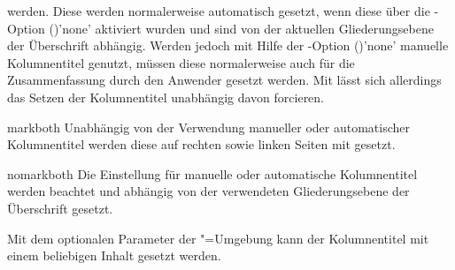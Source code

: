 \begin{Declaration*}{}
\begin{Declaration*}{}
\begin{Declaration*}{}
\begin{Declaration}[%
  v2.02!\Option{abstract=multiple}:ersetzt \Option{abstract=double};%
  v2.02!\Option{abstract=tocleveldown};%
  v2.02!\Option{abstract=markboth};%
  v2.04!\Option{abstract=tocmultiple}%
]{}
werden. Diese werden normalerweise automatisch gesetzt, wenn diese über die 
\KOMAScript-Option ()'none' 
aktiviert wurden und sind von der aktuellen Gliederungsebene der Überschrift 
abhängig. Werden jedoch mit Hilfe der \KOMAScript-Option 
()'none' manuelle Kolumnentitel 
genutzt, müssen diese normalerweise auch für die Zusammenfassung durch den 
Anwender gesetzt werden. Mit  lässt sich allerdings 
das Setzen der Kolumnentitel unabhängig davon forcieren.
%
\begin{values}{}
\item[markboth]
  Unabhängig von der Verwendung manueller oder automatischer Kolumnentitel 
  werden diese auf rechten sowie linken Seiten mit  gesetzt.
\item[nomarkboth]
  Die Einstellung für manuelle oder automatische Kolumnentitel werden beachtet 
  und abhängig von der verwendeten Gliederungsebene der Überschrift gesetzt.
\end{values}
%
Mit dem optionalen Parameter  der 
"=Umgebung kann der Kolumnentitel mit einem beliebigen 
Inhalt gesetzt werden.


\end{Declaration}
\end{Declaration*}
\end{Declaration*}
\end{Declaration*}
